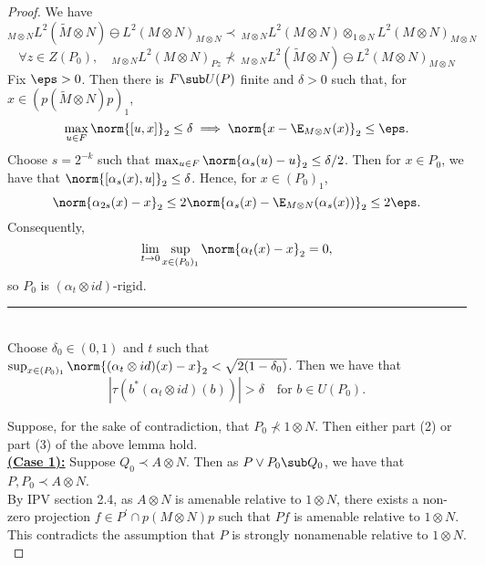 \documentclass[12pt]{article}
\begin{document}
\begin{proof}
  We have 
  \[
    _{M \otimes N} L^{2}(\widetilde{M} \otimes N) \ominus L^{2}(M \otimes N)_{M \otimes N} \prec \, _{M \otimes N} L^{2}(M \otimes N) \otimes_{1 \otimes N} L^{2}(M \otimes N)_{M \otimes N}
  \]
  \[
    \forall z\in Z(P_{0}),\quad _{M \otimes N} L^{2}(M \otimes N)_{Pz} \not\prec \,_{M \otimes N} L^{2}(\widetilde{M} \otimes N) \ominus L^{2}(M \otimes N)_{M \otimes N}
  \]
  Fix $ \eps > 0 $. Then there is $ F\sub U(P) $ finite and $ \delta>0 $ such that, for $ x\in (p(\widetilde{M} \otimes N)p)_{1} $,
  \[
    \max_{u\in F} \norm{[u,x]}_{2}\leq \delta \implies \norm{x- \E_{M \otimes N}(x)}_{2}\leq \eps.
  \]
  Choose $ s = 2^{-k} $ such that $ \max_{u\in F} \norm{ \alpha_{s}(u) - u}_{2}\leq \delta/2 $. Then for $ x\in P_{0} $, we have that $ \norm{[\alpha_{s}(x),u]}_{2}\leq \delta $. Hence, for $ x\in (P_{0})_{1} $,
  \begin{equation}
    \norm{\alpha_{2s}(x)-x}_{2}\leq 2 \norm{\alpha_{s}(x) - \E_{M \otimes N}(\alpha_{s}(x))}_{2} \leq 2\eps.
  \end{equation}
  Consequently, 
  \[
    \lim_{t\to 0} \sup_{x\in (P_{0})_{1}} \norm{\alpha_{t}(x) -x}_{2} = 0,
  \]
  so $ P_{0} $ is $ (\alpha_{t} \otimes id) $-rigid.\\

  \rule{14cm}{1pt}\\


  Choose $ \delta_{0}\in (0,1) $ and $ t $ such that $ \sup_{x\in(P_{0})_{1}}\norm{(\alpha_{t}\otimes id)(x)-x}_{2}< \sqrt{2(1-\delta_{0})} $. Then we have that 
  \[
    | \tau( b^{*}( \alpha_{t}\otimes id)(b))|> \delta\quad \text{for }b\in U(P_{0}).
  \]

  Suppose, for the sake of contradiction, that $ P_{0}\not\prec 1 \otimes N $. Then either part (2) or part (3) of the above lemma hold.\\


  \underline{\textbf{(Case 1):}} Suppose $ Q_{0} \prec A \otimes N $. Then as $ P\vee P_{0}\sub Q_{0} $, we have that $ P,P_{0}\prec A \otimes N $. \\

  By IPV section 2.4, as $ A \otimes N $ is amenable relative to $ 1 \otimes N $, there exists a non-zero projection $  f\in P^{\prime}\cap p(M \otimes N)p$  such that $ Pf  $ is amenable relative to $ 1 \otimes N $. This contradicts the assumption that $ P $ is strongly nonamenable relative to $ 1 \otimes N $.\\


\end{proof}
\end{document}
